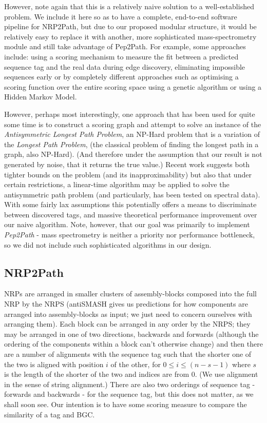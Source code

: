 \documentclass{l4proj}
\newcommand{\cit}[1]{\citep{#1}}
\begin{document}
However, note again that this is a relatively naive solution to a well-established problem. We include it here so as to have a complete, end-to-end software pipeline for NRP2Path, but due to our proposed modular structure, it would be relatively easy to replace it with another, more sophisticated mass-spectrometry module and still take advantage of Pep2Path. For example, some approaches include: using a scoring mechanism to measure the fit between a predicted sequence tag and the real data during edge discovery, eliminating impossible sequences early or by completely different approaches such as optimising a scoring function over the entire scoring space using a genetic algorithm or using a Hidden Markov Model. \cit{protointro}

However, perhaps most interestingly, one approach that has been used for quite some time is to construct a scoring graph and attempt to solve an instance of the \textit{Antisymmetric Longest Path Problem}, an NP-Hard problem that is a variation of the \textit{Longest Path Problem}, (the classical problem of finding the longest path in a graph, also NP-Hard). \cit{protobook} (And therefore under the assumption that our result is not generated by noise, that it returns the true value.) Recent work suggests both tighter bounds on the problem (and its inapproximability) \cit{alppbound} but also that under certain restrictions, a linear-time algorithm may be applied to solve the antisymmetric path problem (and particularly, has been tested on spectral data). \cit{alpplinear} With some fairly lax assumptions this potentially offers a means to discriminate between discovered tags, and massive theoretical performance improvement over our naive algorithm. Note, however, that our goal was primarily to implement \textit{Pep2Path} - mass spectrometry is neither a priority nor performance bottleneck, so we did not include such sophisticated algorithms in our design.

\subsection{NRP2Path} \label{nrpalg}

NRPs are arranged in smaller clusters of assembly-blocks composed into the full NRP by the NRPS (antiSMASH gives us predictions for how components are arranged into assembly-blocks as input; we just need to concern ourselves with arranging them). Each block can be arranged in any order by the NRPS; they may be arranged in one of two directions, backwards and forwards (although the ordering of the components within a block can't otherwise change) and then there are a number of alignments with the sequence tag such that the shorter one of the two is aligned with position \(i\) of the other, for \(0 \leq i \leq (n-s-1)\) where \(s\) is the length of the shorter of the two and indices are from \(0\). (We use alignment in the sense of string alignment.) There are also two orderings of sequence tag - forwards and backwards - for the sequence tag, but this does not matter, as we shall soon see. Our intention is to have some scoring measure to compare the similarity of a tag and BGC.
\end{document}
